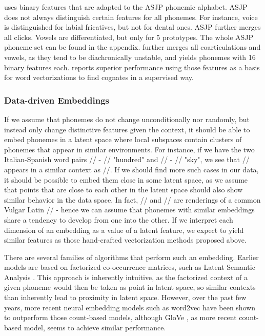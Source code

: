 \documentclass[8pt]{article}
\begin{document}
\cite{rama2016siamese} uses binary features that are adapted to the ASJP phonemic alphabet. ASJP does not always distinguish certain features for all phonemes. For instance, voice is distinguished for labial fricatives, but not for dental ones. ASJP further merges all clicks. Vowels are differentiated, but only for 5 prototypes. The whole ASJP phoneme set can be found in the appendix. \cite{rama2016siamese} further merges all coarticulations and vowels, as they tend to be diachronically unstable, and yields phonemes with 16 binary features each. \cite{rama2016siamese} reports superior performance using those features as a basis for word vectorizations to find cognates in a supervised way.
\subsubsection{Data-driven Embeddings}




If we assume that phonemes do not change unconditionally nor randomly, but instead only change distinctive features given the context, it should be able to embed phonemes in a latent space where local subspaces contain clusters of phonemes that appear in similar environments. For instance, if we have the two Italian-Spanish word pairs // - // "hundred" and  // - // "sky", we see that // appears in a similar context as //. If we should find more such cases in our data, it should be possible to embed them close in some latent space, as we assume that points that are close to each other in the latent space should also show similar behavior in the data space. In fact, // and // are renderings of a common Vulgar Latin // - hence we can assume that phonemes with similar embeddings share a tendency to develop from one into the other. If we interpret each dimension of an embedding as a value of a latent feature, we expect to yield similar features as those hand-crafted vectorization methods proposed above.



There are several families of algorithms that perform such an embedding. Earlier models are based on factorized co-occurrence matrices, such as Latent Semantic Analysis \cite{landauer2013handbook}. This approach is inherently intuitive, as the factorized context of a given phoneme would then be taken as point in latent space, so similar contexts than inherently lead to proximity in latent space. However, over the past few years, more recent neural embedding models such as word2vec \cite{mikolov2013efficient,mikolov2013distributed,goldberg2014word2vec}  have been shown to outperform those count-based models, although GloVe \cite{pennington2014glove}, as more recent count-based model, seems to achieve similar performance.
\end{document}
